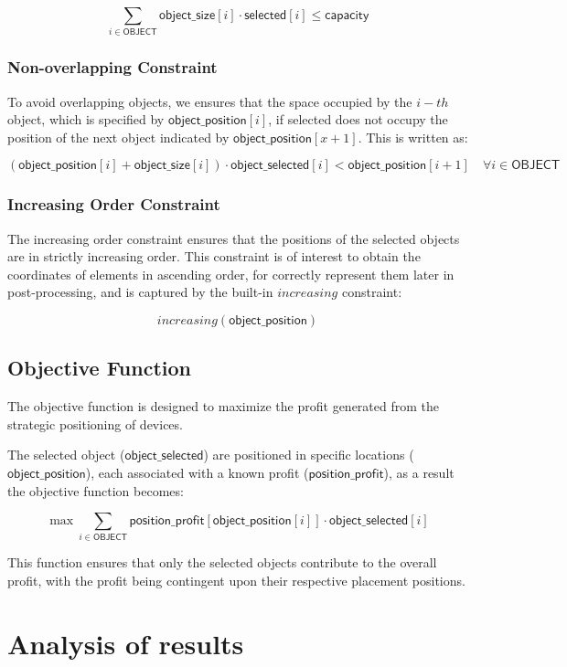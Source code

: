 \documentclass[runningheads]{llncs}
\begin{document}
\[
\sum_{i \in \mathsf{OBJECT}} \mathsf{object\_size}[i] \cdot \mathsf{selected}[i] \leq \mathsf{capacity}
\]

\subsubsection{Non-overlapping Constraint} To avoid overlapping objects, we ensures that the space occupied by the \(i-th\) object, which is specified by \(\mathsf{object\_position}[i]\), if selected does not occupy the position of the next object indicated by \(\mathsf{object\_position}[x + 1]\). This is written as:

\[
(\mathsf{object\_position}[i] + \mathsf{object\_size}[i]) \cdot \mathsf{object\_selected}[i] < \mathsf{object\_position}[i+1] \quad \forall i \in \mathsf{OBJECT}
\]

\subsubsection{Increasing Order Constraint} The increasing order constraint ensures that the positions of the selected objects are in strictly increasing order. This constraint is of interest to obtain the coordinates of elements in ascending order, for correctly represent them later in post-processing, and is captured by the built-in \(increasing\) constraint:

\[increasing(\mathsf{object\_position})\]

\subsection{Objective Function}

The objective function is designed to maximize the profit generated from the strategic positioning of devices. 

The selected object (\(\mathsf{object\_selected}\)) are positioned in specific locations (\(\mathsf{object\_position}\)), each associated with a known profit (\(\mathsf{position\_profit}\)), as a result the objective function becomes:

\[
\max \sum_{i \in \mathsf{OBJECT}} \mathsf{position\_profit}[\mathsf{object\_position}[i]] \cdot \mathsf{object\_selected}[i]
\]

This function ensures that only the selected objects contribute to the overall profit, with the profit being contingent upon their respective placement positions.

\section{Analysis of results}
\end{document}
